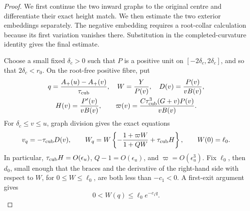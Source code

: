 \begin{proof}
We first continue the two inward graphs to the original centre and
differentiate their exact height match. We then estimate the two
exterior embeddings separately. The negative embedding requires a
root-collar calculation because its first variation vanishes there.
Substitution in the completed-curvature identity gives the final estimate.

Choose a small fixed \(\delta_c>0\) such that \(P\) is a positive unit
on \([-2\delta_c,2\delta_c]\), and so that
\(2\delta_c<r_0\).  On the root-free positive fibre, put
\[
 \begin{gathered}
 q=\frac{A_+(u)-A_+(v)}{\tau_{\rm cub}},\quad
 W=\frac{Y}{P(v)},\quad D(v)=\frac{P(v)}{vB(v)},\\
 H(v)=\frac{P'(v)}{vB(v)},\qquad
 \varpi(v)=\frac{C\tau_{\rm cub}^3(G+v)P(v)}{vB(v)}.
 \end{gathered}
\]
For \(\delta_c\le v\le u\), graph division gives the exact equations
\begin{equation}
 v_q=-\tau_{\rm cub} D(v),\qquad
 W_q=W\left\{-\frac{1+\varpi W}{1+QW}+\tau_{\rm cub} H\right\},
 \qquad W(0)=\ell_0.
 \label{deg:weighted-inward-equations}
\end{equation}
In particular, \(\tau_{\rm cub} H=O(\epsilon_u)\),
\(Q-1=O(\epsilon_u)\), and
\(\varpi=O(\epsilon_u^3)\).  Fix \(\ell_0\), then \(d_0\),
small enough that the braces and the derivative of the right-hand side
with respect to \(W\), for \(0\le W\le\ell_0\), are both less than
\(-c_1<0\).  A first-exit argument gives
\begin{equation}
 0<W(q)\le\ell_0e^{-c_1q}.
 \label{deg:weighted-kernel-decay}
\end{equation}


\end{proof}
